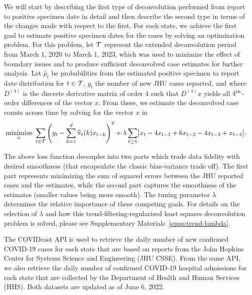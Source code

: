 \documentclass{article}
\begin{document}
We will start by describing the first type of deconvolution performed from
report to positive specimen date in detail and then describe the second type in
terms of the changes made with respect to the first. For each state, we achieve
the first goal to estimate positive specimen dates for the cases by solving an
optimization problem. 
For this problem, let $\mathcal{T}$ represent the extended deconvolution period from
March 1, 2020 to March 1, 2023, which was used to minimize the effect of
boundary issues and to produce sufficient deconvolved case estimates for further
analysis. Let $\hat{p}_t$ be probabilities from the estimated positive specimen
to report date distribution for $t \in \mathcal{T}$, $y_t$ the number of new JHU cases
reported, and where $D^{(4)}$ is the discrete derivative matrix of order 4 such
that $D^{(4)}x$ yields all $4^{\textnormal{th}}$-order differences of the vector $x$. From
these, we estimate the deconvolved case counts across time by solving for the
vector $x$ in 
\begin{align*}
\minimize_{x}\ \sum_{t \in \cT} \left ( y_t -  \sum_{k = 1}^{d} \widehat{\pi}_{t}(k)x_{t-k} 
\right )^2 + \lambda \sum_{t \geq 5}\bigl| x_t - 4x_{t-1} +  6x_{t-2}  - 4x_{t-3}  + x_{t-4}\bigr|. %
\end{align*}

The above loss function decouples into two parts which trade data fidelity with
desired smoothness (that
encapsulate the classic bias-variance trade off). The first part represents
minimizing the sum of squared errors between the JHU reported cases and the
estimates, while the second part captures the smoothness of the estimates
(smaller values being more smooth). The tuning parameter $\lambda$ determines
the relative importance of these competing goals. For details on the selection of $\lambda$
and how this trend-filtering-regularized least squares deconvolution problem is solved, please see
Supplementary Materials~\ref{supp:trend-lambda}.

The COVIDcast API \citep{reinhart2021open} is used to retrieve the daily number
of new confirmed COVID-19 cases for each state that are based on reports from
the John Hopkins Center for Systems Science and Engineering (JHU
CSSE)\citealp{dong2020interactive}. From the same API, we also retrieve the
daily number of confirmed COVID-19 hospital admissions for each state that are
collected by the \US Department of Health and Human Services (HHS). Both
datasets are updated as of June 6, 2022.
\end{document}
